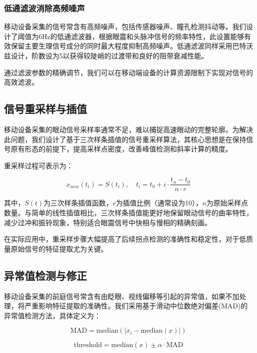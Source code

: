 \subsubsection{低通滤波消除高频噪声}

移动设备采集的信号常含有高频噪声，包括传感器噪声、瞳孔检测抖动等。我们设计了阈值为6Hz的低通滤波器，根据眼震和头脉冲信号的频率特性，此设置能够有效保留主要生理信号成分的同时最大程度抑制高频噪声。低通滤波同样采用巴特沃兹设计，阶数设为5以获得较陡峭的过渡带和良好的阻带衰减性能。

通过滤波参数的精确调节，我们可以在移动端设备的计算资源限制下实现对信号的高效滤波。

\subsection{信号重采样与插值}

移动设备采集的眼动信号采样率通常不足，难以捕捉高速眼动的完整轮廓。为解决此问题，我们设计了基于三次样条插值的信号重采样算法，其核心思想是在保持信号原有形态的前提下，提高采样点密度，改善峰值检测和斜率计算的精度。

重采样过程可表示为：

\begin{equation}
x_{new}(t_i) = S(t_i), \quad t_i = t_0 + i \cdot \frac{t_n - t_0}{n \cdot r}
\end{equation}

其中，$S(t)$为三次样条插值函数，$r$为插值比例（通常设为10），$n$为原始采样点数量。与简单的线性插值相比，三次样条插值能更好地保留眼动信号的曲率特性，减少过冲和振铃现象，特别适合眼震信号中快相与慢相的精确刻画。

在实际应用中，重采样步骤大幅提高了后续拐点检测的准确性和稳定性，对于低质量原始信号的特征提取尤为关键。

\subsection{异常值检测与修正}

移动设备采集的前庭信号常含有由眨眼、视线偏移等引起的异常值，如果不加处理，将严重影响特征提取的准确性。我们采用基于滑动中位数绝对偏差(MAD)的异常值检测方法，具体定义为：

\begin{equation}
\text{MAD} = \text{median}(|x_i - \text{median}(x)|)
\end{equation}

\begin{equation}
\text{threshold} = \text{median}(x) \pm \alpha \cdot \text{MAD}
\end{equation}

